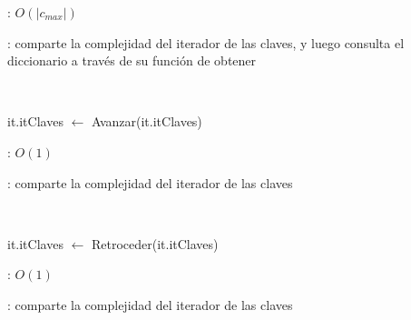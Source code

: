 \begin{Algoritmos}
	\complejidad: $O(|c_{max}|)$

	\justifcomp: comparte la complejidad del iterador de las claves, y luego consulta el diccionario a través de su función de obtener

	~

	\begin{algorithm}[H]
		\NoCaptionOfAlgo
		\caption{}
		it.itClaves $\leftarrow$ Avanzar(it.itClaves) 
	\end{algorithm}

	\complejidad: $O(1)$

	\justifcomp: comparte la complejidad del iterador de las claves

	~

	\begin{algorithm}[H]
		\NoCaptionOfAlgo
		\caption{}
		it.itClaves $\leftarrow$ Retroceder(it.itClaves) 
	\end{algorithm}

	\complejidad: $O(1)$

	\justifcomp: comparte la complejidad del iterador de las claves

\end{Algoritmos}